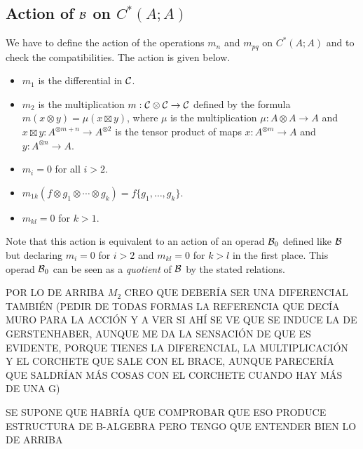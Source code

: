 \documentclass[TFM.tex]{subfiles}
\begin{document}
\subsection{Action of $\mathcal{B}$ on $C^*(A;A)$}
We have to define the action of the operations
$m_n$ and $m_{pq}$ on $C^*(A;A)$ and to check the compatibilities. The action is given below.
\begin{itemize}
\item $m_1$ is the differential in $\mathcal{C}$. 
\item $m_2$ is the multiplication $m:\mathcal{C}\otimes\mathcal{C}\to\mathcal{C}$ defined by the formula $m(x\otimes y)=\mu(x\boxtimes y)$, where $\mu$ is the multiplication $\mu:A\otimes A\to A$ and $x\boxtimes y:A^{\otimes m+n}\to A^{\otimes 2}$ is the tensor product of maps $x:A^{\otimes m}\to A$ and $y:A^{\otimes n}\to A$.
\item $m_i=0$ for all $i>2$.
\item $m_{1k}(f\otimes g_1\otimes\cdots\otimes g_k)=f\{g_1,\dots, g_k\}$.
\item $m_{kl}=0$ for $k>1$.
\end{itemize}
Note that this action is equivalent to an action of an operad $\mathcal{B}_0$ defined like $\mathcal{B}$ but declaring $m_i=0$ for $i>2$ and $m_{kl}=0$ for $k>l$ in the first place. This operad $\mathcal{B}_0$ can be seen as a \emph{quotient} of $\mathcal{B}$ by the stated relations. 

POR LO DE ARRIBA $M_2$ CREO QUE DEBERÍA SER UNA DIFERENCIAL TAMBIÉN (PEDIR DE TODAS FORMAS LA REFERENCIA QUE DECÍA MURO PARA LA ACCIÓN Y A VER SI AHÍ SE VE QUE SE INDUCE LA DE GERSTENHABER, AUNQUE ME DA LA SENSACIÓN DE QUE ES EVIDENTE, PORQUE TIENES LA DIFERENCIAL, LA MULTIPLICACIÓN Y EL CORCHETE QUE SALE CON EL BRACE, AUNQUE PARECERÍA QUE SALDRÍAN MÁS COSAS CON EL CORCHETE CUANDO HAY MÁS DE UNA G)

SE SUPONE QUE HABRÍA QUE COMPROBAR QUE ESO PRODUCE ESTRUCTURA DE B-ALGEBRA PERO TENGO QUE ENTENDER BIEN LO DE ARRIBA
\end{document}

